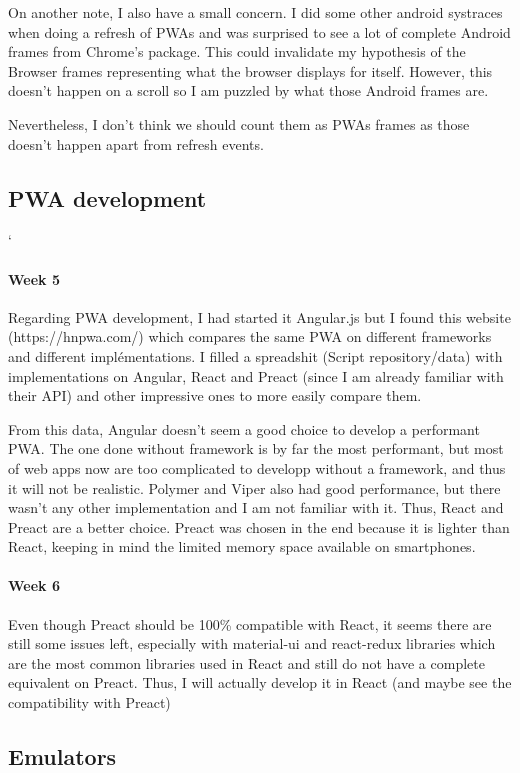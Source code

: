 \documentclass{kththesis}
\begin{document}
On another note, I also have a small concern. I did some other android systraces when doing a refresh of PWAs and was surprised to see a lot of complete Android frames from Chrome's package. This could invalidate my hypothesis of the Browser frames representing what the browser displays for itself. However, this doesn't happen on a scroll so I am puzzled by what those Android frames are. 

Nevertheless, I don't think we should count them as PWAs frames as those doesn't happen apart from refresh events. 

\subsection{PWA development}
`\paragraph{Week 5}
Regarding PWA development, I had started it Angular.js but I found this website (https://hnpwa.com/) which compares the same PWA on different frameworks and different implémentations. I filled a spreadshit (Script repository/data) with implementations on Angular, React and Preact (since I am already familiar with their API) and other impressive ones to more easily compare them. 

From this data, Angular doesn't seem a good choice to develop a performant PWA. The one done without framework is by far the most performant, but most of web apps now are too complicated to developp without a framework, and thus it will not be realistic. Polymer and Viper also had good performance, but there wasn't any other implementation and I am not familiar with it. Thus, React and Preact are a better choice. Preact was chosen in the end because it is lighter than React, keeping in mind the limited memory space available on smartphones. 

\paragraph{Week 6}
Even though Preact should be 100\% compatible with React, it seems there are still some issues left, especially with material-ui and react-redux libraries which are the most common libraries used in React and still do not have a complete equivalent on Preact. Thus, I will actually develop it in React (and maybe see the compatibility with Preact)


\subsection{Emulators}
\end{document}
